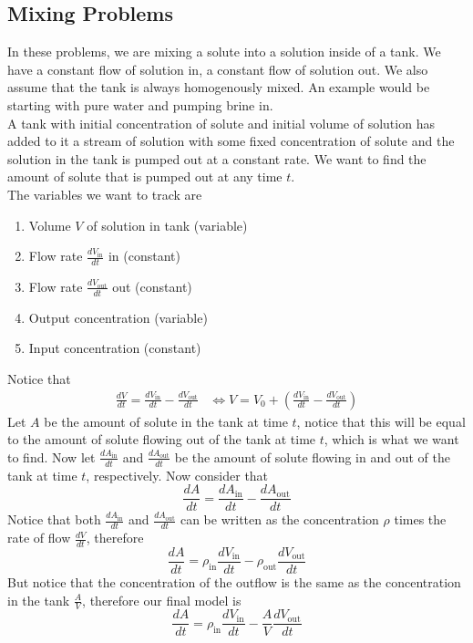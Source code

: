 \documentclass[notes]{subfiles}
\begin{document}
\subsection{Mixing Problems}
In these problems, we are mixing a solute into a solution inside of a tank. We have a constant flow of solution in, a constant flow of solution out. We also assume that the tank is always homogenously mixed. An example would be starting with pure water and pumping brine in. \\
A tank with initial concentration of solute and initial volume of solution has added to it a stream of solution with some fixed concentration of solute and the solution in the tank is pumped out at a constant rate. We want to find the amount of solute that is pumped out at any time $t$. \\
The variables we want to track are
\begin{enumerate}[label = \textbullet]
    \item Volume $V$ of solution in tank (variable)
    \item Flow rate $\frac{dV_{\mathrm{in}}}{dt}$ in (constant)
    \item Flow rate $\frac{dV_{\mathrm{out}}}{dt}$ out (constant)
    \item Output concentration (variable)
    \item Input concentration (constant)
\end{enumerate}
Notice that
\begin{align*}
    \frac{dV}{dt} = \frac{dV_{\mathrm{in}}}{dt} - \frac{dV_{\mathrm{out}}}{dt}
    &\iff V = V_0 + \left( \frac{dV_{\mathrm{in}}}{dt} - \frac{dV_{\mathrm{out}}}{dt} \right)
\end{align*}
Let $A$ be the amount of solute in the tank at time $t$, notice that this will be equal to the amount of solute flowing out of the tank at time $t$, which is what we want to find. Now let $\frac{dA_{\mathrm{in}}}{dt}$ and $\frac{dA_{\mathrm{out}}}{dt}$ be the amount of solute flowing in and out of the tank at time $t$, respectively. Now consider that
\[
    \frac{dA}{dt} = \frac{dA_{\mathrm{in}}}{dt} - \frac{dA_{\mathrm{out}}}{dt}
\]
Notice that both $\frac{dA_{\mathrm{in}}}{dt}$ and $\frac{dA_{\mathrm{out}}}{dt}$ can be written as the concentration $\rho$ times the rate of flow $\frac{dV}{dt}$, therefore
\[
    \frac{dA}{dt} = \rho_{\mathrm{in}}\frac{dV_{\mathrm{in}}}{dt} - \rho_{\mathrm{out}}\frac{dV_{\mathrm{out}}}{dt}
\]
But notice that the concentration of the outflow is the same as the concentration in the tank $\frac{A}{V}$, therefore our final model is
\[
    \frac{dA}{dt} = \rho_{\mathrm{in}}\frac{dV_{\mathrm{in}}}{dt} - \frac{A}{V}\frac{dV_{\mathrm{out}}}{dt}
\]
\end{document}
